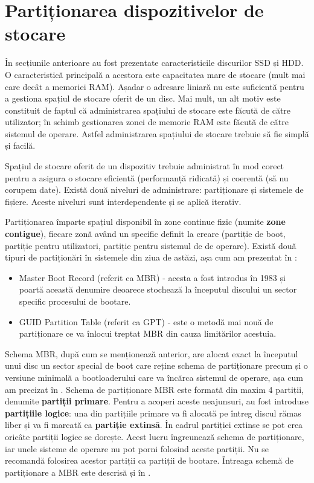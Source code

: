 \section{Partiționarea dispozitivelor de stocare}
\label{sec:storage:partition}

În secțiunile anterioare au fost prezentate caracteristicile discurilor
SSD și HDD. O caracteristică principală a acestora este capacitatea mare de
stocare (mult mai care decât a memoriei RAM). Așadar o adresare liniară nu este
suficientă pentru a gestiona spațiul de stocare oferit de un disc. Mai mult, un
alt motiv este constituit de faptul că administrarea spațiului de stocare este
făcută de către utilizator; în schimb gestionarea zonei de memorie RAM este
făcută de către sistemul de operare. Astfel administrarea spațiului de stocare
trebuie să fie simplă și facilă.

Spațiul de stocare oferit de un dispozitiv trebuie administrat în mod corect
pentru a asigura o stocare eficientă (performanță ridicată) și coerentă (să nu
corupem date). Există două niveluri de administrare: partiționare și sistemele de
fișiere. Aceste niveluri sunt interdependente și se aplică iterativ.

Partiționarea împarte spațiul disponibil în zone continue fizic (numite \textbf{zone contigue}), fiecare zonă
având un specific definit la creare (partiție de boot, partiție pentru
utilizatori, partiție pentru sistemul de de operare). Există două tipuri de
partiționări în sistemele din ziua de astăzi, așa cum am prezentat în
:

\begin{itemize}
  \item Master Boot Record (referit ca MBR) - acesta a fost introdus în
    1983 și poartă această denumire deoarece stochează la începutul
    discului un sector specific procesului de bootare.
  \item GUID Partition Table (referit ca GPT) - este o metodă mai nouă de
    partiționare ce va înlocui treptat MBR din cauza limitărilor
    acestuia.
\end{itemize}

Schema MBR, după cum se menționează anterior, are alocat exact la începutul unui
disc un sector special de boot care reține schema de partiționare precum și o
versiune minimală a bootloaderului care va încărca sistemul de operare, așa cum am precizat în .
Schema de partiționare MBR este formată din maxim 4
partiții, denumite \textbf{partiții primare}. Pentru a acoperi aceste neajunsuri, au fost
introduse \textbf{partițiile logice}: una din partițiile primare va fi alocată pe întreg
discul rămas liber și va fi marcată ca \textbf{partiție extinsă}. În cadrul partiției
extinse se pot crea oricâte partiții logice se dorește. Acest lucru îngreunează
schema de partiționare, iar unele sisteme de operare nu pot porni folosind
aceste partiții. Nu se recomandă folosirea acestor partiții ca partiții de
bootare. Întreaga schemă de partiționare a MBR este descrisă și în
.

